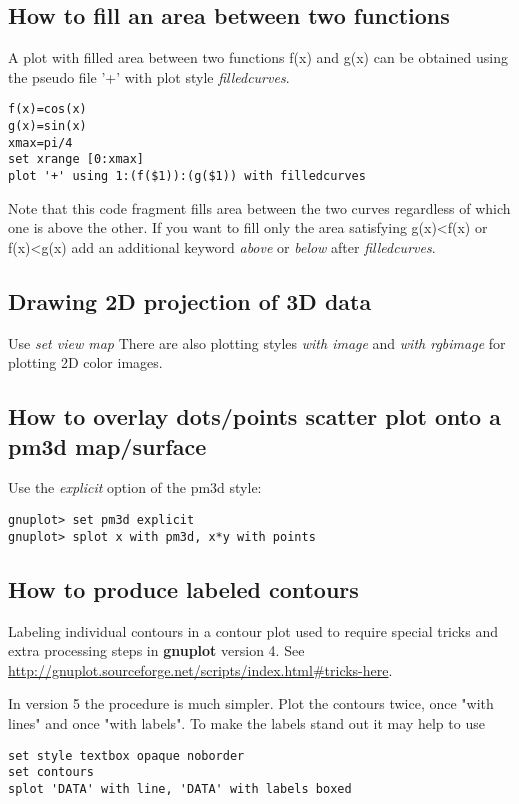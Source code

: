 \documentclass[a4paper,11pt]{article}
\def\http#1{{\small\href{http://#1}{\url{http://#1}}}}
\newcommand{\http}[1]%
            {\htmladdnormallink{\latex{\url{http://#1}}%
                    \html{\textit{http://#1}}}%
                {http://#1}%
            }
\newcommand{\gnuplot}{\textbf{gnuplot }}
\begin{document}
\subsection{How to fill an area between two functions}

A plot with filled area between two functions f(x) and g(x) can be obtained using
the pseudo file '+' with  plot style {\em filledcurves}.
\small
\begin{verbatim}
f(x)=cos(x)
g(x)=sin(x)
xmax=pi/4
set xrange [0:xmax]
plot '+' using 1:(f($1)):(g($1)) with filledcurves
\end{verbatim}
\normalsize

Note that this code fragment fills area between the two curves regardless of
which one is above the other.  If you want to fill only the area satisfying g(x)<f(x)
or f(x)<g(x)
add an additional keyword {\em above} or {\em below} after {\em filledcurves}.



\subsection{Drawing 2D projection of 3D data}

Use \textit{set view map}
There are also plotting styles {\em with image} and {\em with rgbimage}
for plotting 2D color images.

\subsection{How to overlay dots/points scatter plot onto a pm3d map/surface}

Use the {\em explicit} option of the pm3d style:
\small
\begin{verbatim}
gnuplot> set pm3d explicit
gnuplot> splot x with pm3d, x*y with points
\end{verbatim}
\normalsize


\subsection{How to produce labeled contours}

Labeling individual contours in a contour plot used to require special
tricks and extra processing steps in \gnuplot version 4.
See
\http{gnuplot.sourceforge.net/scripts/index.html\#tricks-here}.

In version 5 the procedure is much simpler.  Plot the contours twice,
once "with lines" and once "with labels".  To make the labels stand out
it may help to use
\begin{verbatim}
set style textbox opaque noborder
set contours
splot 'DATA' with line, 'DATA' with labels boxed
\end{verbatim}
\end{document}
